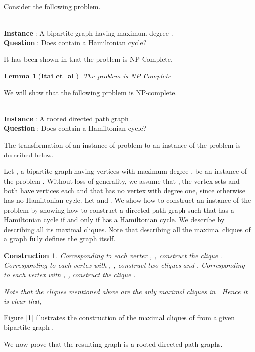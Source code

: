 \documentclass[a4paper,12pt]{article}
\theoremstyle{plain}
\newtheorem{lemma}[theorem]{Lemma}
\newtheorem{cons}[theorem]{Construction}
\theoremstyle{definition}
\theoremstyle{remark}
\begin{document}
Consider the following  problem.

\\
{\bf Instance} : A bipartite graph  having maximum degree .\\
{\bf Question} : Does  contain a Hamiltonian cycle?

It has been shown in \cite{itai} that the  problem  is
NP-Complete.

\begin{lemma}[\bf Itai et. al \cite{itai}]\label{lemma3}
The problem  is NP-Complete.
\end{lemma}

We will show that the following problem  is NP-complete.

\\
{\bf Instance} : A rooted directed path graph .\\
{\bf Question} : Does  contain a Hamiltonian cycle?

The transformation of an instance of problem  to an instance of
the problem  is described below.

Let , a bipartite graph having  vertices with maximum
degree , be an instance of the problem .  Without loss of
generality, we assume that , the vertex sets  and
 both have  vertices each and that  has no vertex with
degree one, since otherwise  has  no Hamiltonian cycle. Let
 and . We
show how to construct an instance of the problem  by showing
how to construct a directed path graph  such that  has a
Hamiltonian cycle if and only if  has a Hamiltonian cycle. We
describe  by describing all its maximal cliques. Note that
describing all the maximal cliques of a graph fully defines the
graph itself.


\begin{cons}\label{cons1}
\noindent Corresponding to each  vertex , ,  construct the clique . Corresponding to each  vertex
 with ,  , construct two
cliques  and . Corresponding to each  vertex  with , ,  construct the  clique .





Note that the cliques mentioned above are the only maximal cliques
in . Hence it is clear that,   

\end{cons}

Figure \ref{1} illustrates the construction of the maximal cliques
of  from a given bipartite graph .

We now prove that the resulting graph  is a rooted directed path
graphs.
\end{document}
